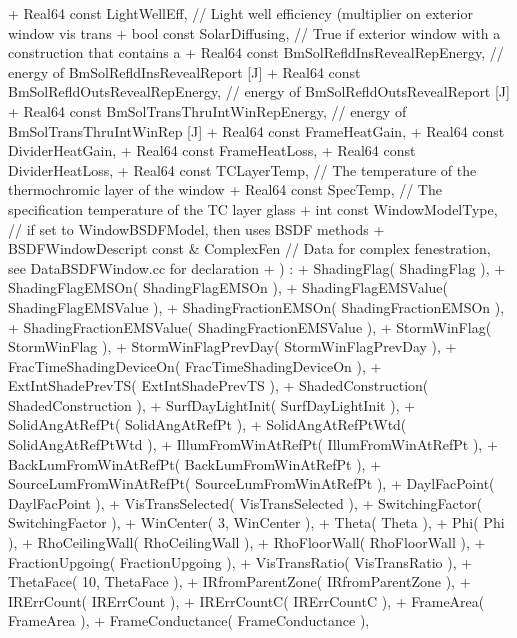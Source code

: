 \begin{DoxyCode}
+           Real64 const LightWellEff, // Light well efficiency (multiplier on exterior window vis trans
+           bool const SolarDiffusing, // True if exterior window with a construction that contains a
+           Real64 const BmSolRefldInsRevealRepEnergy, // energy of BmSolRefldInsRevealReport [J]
+           Real64 const BmSolRefldOutsRevealRepEnergy, // energy of BmSolRefldOutsRevealReport [J]
+           Real64 const BmSolTransThruIntWinRepEnergy, // energy of BmSolTransThruIntWinRep [J]
+           Real64 const FrameHeatGain,
+           Real64 const DividerHeatGain,
+           Real64 const FrameHeatLoss,
+           Real64 const DividerHeatLoss,
+           Real64 const TCLayerTemp, // The temperature of the thermochromic layer of the window
+           Real64 const SpecTemp, // The specification temperature of the TC layer glass
+           int const WindowModelType, // if set to WindowBSDFModel, then uses BSDF methods
+           BSDFWindowDescript const & ComplexFen // Data for complex fenestration, see DataBSDFWindow.cc
       for declaration
+       ) :
+           ShadingFlag( ShadingFlag ),
+           ShadingFlagEMSOn( ShadingFlagEMSOn ),
+           ShadingFlagEMSValue( ShadingFlagEMSValue ),
+           ShadingFractionEMSOn( ShadingFractionEMSOn ),
+           ShadingFractionEMSValue( ShadingFractionEMSValue ),
+           StormWinFlag( StormWinFlag ),
+           StormWinFlagPrevDay( StormWinFlagPrevDay ),
+           FracTimeShadingDeviceOn( FracTimeShadingDeviceOn ),
+           ExtIntShadePrevTS( ExtIntShadePrevTS ),
+           ShadedConstruction( ShadedConstruction ),
+           SurfDayLightInit( SurfDayLightInit ),
+           SolidAngAtRefPt( SolidAngAtRefPt ),
+           SolidAngAtRefPtWtd( SolidAngAtRefPtWtd ),
+           IllumFromWinAtRefPt( IllumFromWinAtRefPt ),
+           BackLumFromWinAtRefPt( BackLumFromWinAtRefPt ),
+           SourceLumFromWinAtRefPt( SourceLumFromWinAtRefPt ),
+           DaylFacPoint( DaylFacPoint ),
+           VisTransSelected( VisTransSelected ),
+           SwitchingFactor( SwitchingFactor ),
+           WinCenter( 3, WinCenter ),
+           Theta( Theta ),
+           Phi( Phi ),
+           RhoCeilingWall( RhoCeilingWall ),
+           RhoFloorWall( RhoFloorWall ),
+           FractionUpgoing( FractionUpgoing ),
+           VisTransRatio( VisTransRatio ),
+           ThetaFace( 10, ThetaFace ),
+           IRfromParentZone( IRfromParentZone ),
+           IRErrCount( IRErrCount ),
+           IRErrCountC( IRErrCountC ),
+           FrameArea( FrameArea ),
+           FrameConductance( FrameConductance ),

\end{DoxyCode}
